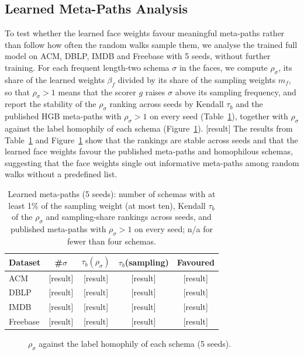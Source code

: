 \documentclass{article}
\newcommand{\res}{{\scriptsize[result]}}
\begin{document}
\subsection{Learned Meta-Paths Analysis}
To test whether the learned face weights favour meaningful meta-paths rather than follow how often the random walks sample them, we analyse the trained full model on ACM, DBLP, IMDB and Freebase with 5 seeds, without further training. For each frequent length-two schema $\sigma$ in the faces, we compute $\rho_\sigma$, its share of the learned weights $\beta_f$ divided by its share of the sampling weights $m_f$, so that $\rho_\sigma>1$ means that the scorer $g$ raises $\sigma$ above its sampling frequency, and report the stability of the $\rho_\sigma$ ranking across seeds by Kendall $\tau_b$ and the published HGB meta-paths with $\rho_\sigma>1$ on every seed (Table~\ref{tab:schema}), together with $\rho_\sigma$ against the label homophily of each schema (Figure~\ref{fig:schema}). \res{} The results from Table~\ref{tab:schema} and Figure~\ref{fig:schema} show that the rankings are stable across seeds and that the learned face weights favour the published meta-paths and homophilous schemas, suggesting that the face weights single out informative meta-paths among random walks without a predefined list.

\begin{table}[!htbp]
  \centering
  \caption{Learned meta-paths (5 seeds): number of schemas with at least 1\% of the sampling weight (at most ten), Kendall $\tau_b$ of the $\rho_\sigma$ and sampling-share rankings across seeds, and published meta-paths with $\rho_\sigma>1$ on every seed; n/a for fewer than four schemas.}
  \label{tab:schema}
  \scriptsize
  \setlength{\tabcolsep}{3pt}
  \begin{tabular}{lcccc}
    \toprule
    \textbf{Dataset} & \#$\sigma$ & $\tau_b(\rho_\sigma)$ & $\tau_b$(sampling) & Favoured \\
    \midrule
    ACM & \res & \res & \res & \res \\
    DBLP & \res & \res & \res & \res \\
    IMDB & \res & \res & \res & \res \\
    Freebase & \res & \res & \res & \res \\
    \bottomrule
  \end{tabular}
\end{table}

\begin{figure}[!htbp]
  \centering
  \caption{$\rho_\sigma$ against the label homophily of each schema (5 seeds).}
  \label{fig:schema}
\end{figure}
\end{document}
